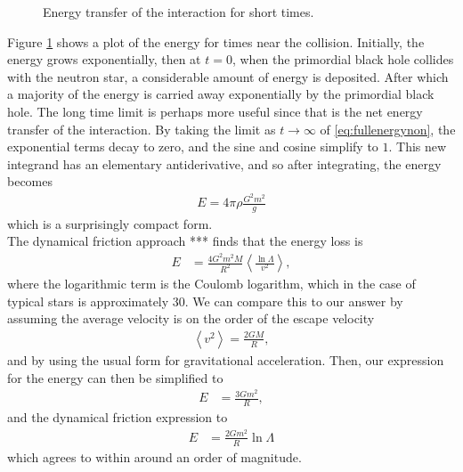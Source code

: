 \begin{figure}[p]
 
 \caption{Energy transfer of the interaction for short times.}
 \label{fig:energy}
\end{figure}

Figure \ref{fig:energy} shows a plot of the energy for times near the collision. Initially, the energy grows exponentially, then at $t=0$, when the primordial black hole collides with the neutron star, a considerable amount of energy is deposited. After which a majority of the energy is carried away exponentially by the primordial black hole. The long time limit is perhaps more useful since that is the net energy transfer of the interaction. By taking the limit as $t \rightarrow \infty$ of \eqref{eq:fullenergynon}, the exponential terms decay to zero, and the sine and cosine simplify to $1$. This new integrand has an elementary antiderivative, and so after integrating, the energy becomes
\begin{align}
\label{eq:energy}
E = 4 \pi \rho \frac{G^2 m^2}{g}
\end{align}
which is a surprisingly compact form. \\

The dynamical friction approach *** finds that the energy loss is
\begin{align*}
E &= \frac{4 G^2 m^2 M}{R^2} \left< \frac{\ln \Lambda}{v^2} \right>,
\end{align*}
where the logarithmic term is the Coulomb logarithm, which in the case of typical stars is approximately $30$. We can compare this to our answer by assuming the average velocity is on the order of the escape velocity
\begin{align*}
\left< v^2 \right> = \frac{2GM}{R},
\end{align*}
and by using the usual form for gravitational acceleration. Then, our expression for the energy can then be simplified to
\begin{align*}
E &= \frac{3Gm^2}{R},
\end{align*}
and the dynamical friction expression to
\begin{align*}
E &= \frac{2Gm^2}{R} \ln \Lambda
\end{align*}
which agrees to within around an order of magnitude.




%
















